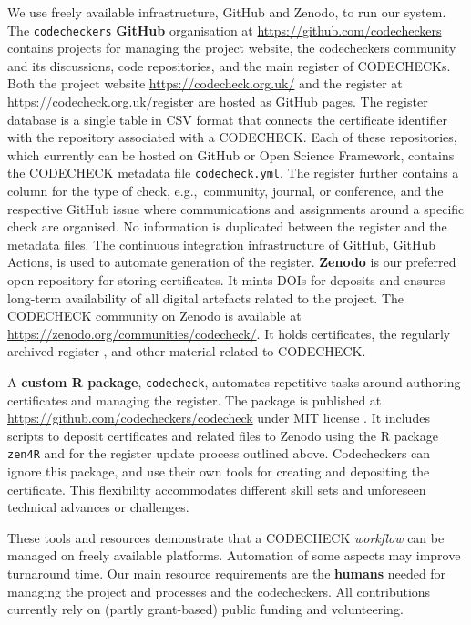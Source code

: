 \documentclass[12pt]{article}
\newcommand{\rev}[1]{\textit{#1}}
\begin{document}
We use freely available infrastructure, GitHub and Zenodo, to run our
system.  The \texttt{codecheckers} \textbf{GitHub} organisation at
\url{https://github.com/codecheckers} contains projects for managing
the project website, the codecheckers community and its discussions,
code repositories, and the main register of CODECHECKs. Both the
project website \url{https://codecheck.org.uk/} and the register at
\url{https://codecheck.org.uk/register} are hosted as GitHub pages.
The register database is a single table in CSV format that connects
the certificate identifier with the repository associated with a
CODECHECK. Each of these repositories, which currently can be hosted
on GitHub or Open Science Framework, contains the CODECHECK
metadata file \texttt{codecheck.yml}. The register further contains a
column for the type of check, e.g.,~community, journal, or conference,
and the respective GitHub issue where communications and assignments
around a specific check are organised. No information is duplicated
between the register and the metadata files. The continuous
integration infrastructure of GitHub, GitHub Actions, is used to
automate generation of the register.  \textbf{Zenodo} is our preferred open
repository for storing certificates. It mints DOIs for deposits and
ensures long-term availability of all digital artefacts related to the
project. The CODECHECK community on Zenodo is available at
\url{https://zenodo.org/communities/codecheck/}. It holds
certificates, the regularly archived register
\cite{codecheck_register_jan2021}, and other material related to
CODECHECK.

A \textbf{custom R package}, \texttt{codecheck}, automates
repetitive tasks around authoring certificates and managing the
register. The package is published at
\url{https://github.com/codecheckers/codecheck} under MIT license
\cite{stephen_eglen_codecheckerscodecheck_2021}.
It includes scripts to deposit certificates and related
files to Zenodo using the R package \texttt{zen4R} \cite{zen4r} and
for the register update process outlined above.  Codecheckers can
ignore this package, and use their own tools for creating
and depositing the certificate.  This flexibility  accommodates
different skill sets and unforeseen technical advances or challenges.

These tools and resources demonstrate that a CODECHECK \rev{workflow} can be
managed on freely available platforms.
Automation of some aspects may improve turnaround time. Our main
resource requirements are the \textbf{humans} needed for managing the
project and processes and the codecheckers.  All contributions
currently rely on (partly grant-based) public funding and
volunteering.
\end{document}
